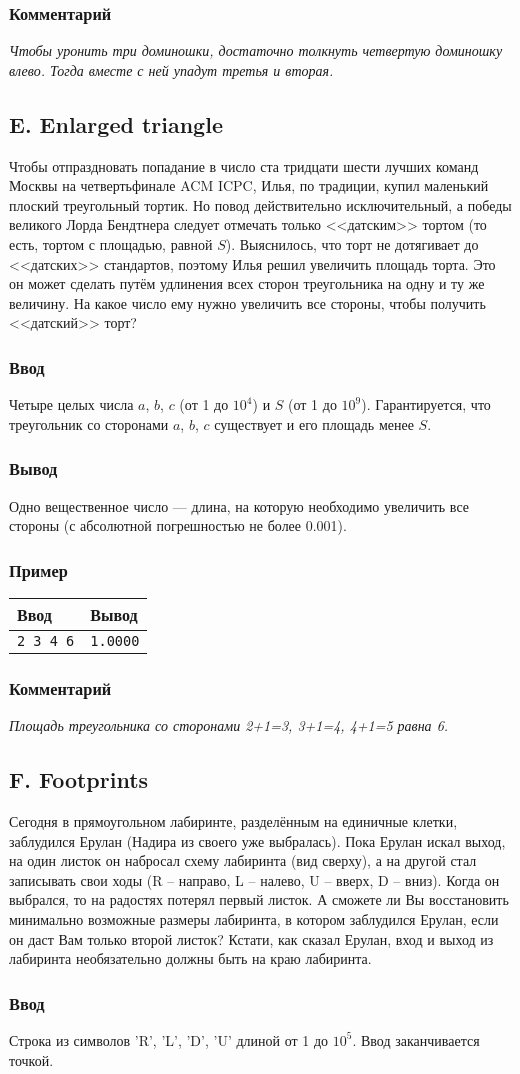 \documentclass[10pt, a4paper]{article}
\newcommand{\informat}[1]
{
	\subsubsection*{Ввод} #1
}
\newcommand{\outformat}[1]
{
	\subsubsection*{Вывод} #1
}
\newcommand{\example}[2]
{
	\subsubsection*{Пример}
	\noindent
	\begin{center}
	\begin{tabularx}{\linewidth}{|X|X|}
	\hline
	Ввод & Вывод \\
	\hline
	{\tt #1} & {\tt #2}		\\
	\hline
	\end{tabularx}
	\end{center}
}
\newcommand{\excomm}[1]
{
	\subsubsection*{Комментарий}
	\textit{#1}
}
\begin{document}
\excomm{Чтобы уронить три доминошки, достаточно толкнуть четвертую доминошку влево. Тогда вместе с ней упадут третья и вторая.}



\subsection*{E. Enlarged triangle}

Чтобы отпраздновать попадание в число ста тридцати шести лучших команд Москвы на четвертьфинале ACM ICPC, Илья, по традиции, купил маленький плоский треугольный тортик. Но повод действительно исключительный, а победы великого Лорда Бендтнера следует отмечать только <<датским>> тортом (то есть, тортом с площадью, равной $S$). Выяснилось, что торт не дотягивает до <<датских>> стандартов, поэтому Илья решил увеличить площадь торта. Это он может сделать путём удлинения всех сторон треугольника на одну и ту же величину. На какое число ему нужно увеличить все стороны, чтобы получить <<датский>> торт?

\informat{Четыре целых числа $a$, $b$, $c$ (от 1 до $10^4$) и $S$ (от 1 до $10^9$). Гарантируется, что треугольник со сторонами $a$, $b$, $c$ существует и его площадь менее $S$.}

\outformat{Одно вещественное число --- длина, на которую необходимо увеличить все стороны (с абсолютной погрешностью не более 0.001).}

\example{2 3 4 6}{1.0000}

\excomm{Площадь треугольника со сторонами 2+1=3, 3+1=4, 4+1=5 равна 6.}



\subsection*{F. Footprints}

Сегодня в прямоугольном лабиринте, разделённым на единичные клетки, заблудился Ерулан (Надира из своего уже выбралась). Пока Ерулан искал выход, на один листок он набросал схему лабиринта (вид сверху), а на другой стал записывать свои ходы (R – направо, L – налево, U – вверх, D – вниз). Когда он выбрался, то на радостях потерял первый листок. А сможете ли Вы восстановить минимально возможные размеры лабиринта, в котором заблудился Ерулан, если он даст Вам только второй листок? Кстати, как сказал Ерулан, вход и выход из лабиринта необязательно должны быть на краю лабиринта.

\informat{Строка из символов 'R', 'L', 'D', 'U' длиной от 1 до $10^5$. Ввод заканчивается точкой.}
\end{document}
